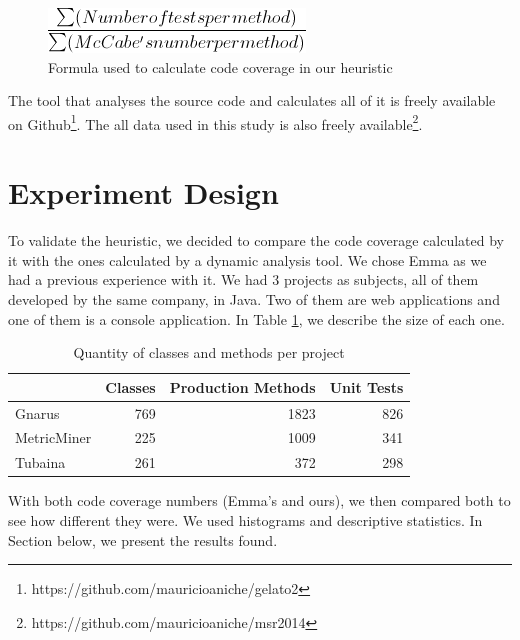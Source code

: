 \documentclass{sig-alternate}
\begin{document}
\begin{figure}[h!H]
  \centering
  \includegraphics[scale=0.6]{imgs/formula.png}
  \caption{Formula used to calculate code coverage in our heuristic}
  \label{fig:formula}
\end{figure}

The tool that analyses the source code and calculates all of it is freely available
on Github\footnote{https://github.com/mauricioaniche/gelato2}. The all data used in this 
study is also freely available\footnote{https://github.com/mauricioaniche/msr2014}.

\section{Experiment Design}
\label{sec-experiment}

To validate the heuristic, we decided to compare the code coverage calculated by it with the ones 
calculated by a dynamic analysis tool. We chose Emma as we had a previous experience with it. We
had 3 projects as subjects, all of them developed by the same company, in Java. Two of them are
web applications and one of them is a console application. In Table \ref{tab:projects}, we describe
the size of each one.

\begin{table}[h!]
\centering
\caption{Quantity of classes and methods per project}
\begin{tabular}{ | l | r | r | r | }
\hline
& Classes & Production Methods & Unit Tests\\ 
\hline
Gnarus & 769 & 1823 & 826\\ 
MetricMiner & 225 & 1009 & 341\\ 
Tubaina & 261 & 372 & 298\\ 

\hline
\end{tabular}
\label{tab:projects}
\end{table}

With both code coverage numbers (Emma's and ours), we then compared both to see how different
they were.
We used histograms and descriptive statistics. In Section below, we present the results found.

\end{document}
